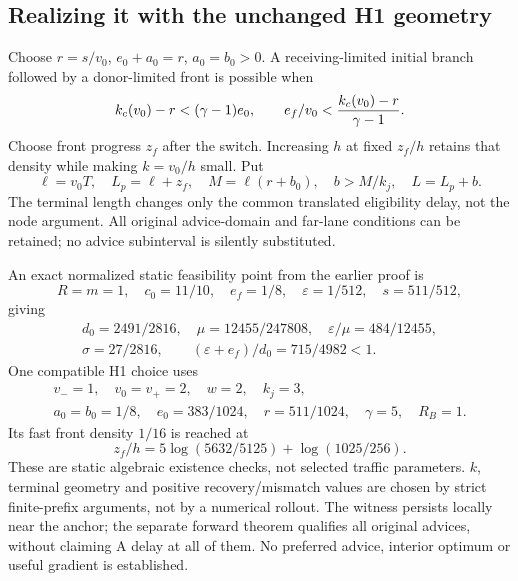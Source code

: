 \subsection{Realizing it with the unchanged H1 geometry}
Choose $r=s/v_0$, $e_0+a_0=r$, $a_0=b_0>0$. A receiving-limited
initial branch followed by a donor-limited front is possible when
\begin{equation}
 k_c(v_0)-r<(\gamma-1)e_0,\qquad
 e_f/v_0<\frac{k_c(v_0)-r}{\gamma-1}. \label{eq:wh1}
\end{equation}
Choose front progress $z_f$ after the switch. Increasing $h$ at fixed
$z_f/h$ retains that density while making $k=v_0/h$ small. Put
\begin{equation}
 \ell=v_0T,\quad L_p=\ell+z_f,\quad
 M=\ell(r+b_0),\quad b>M/k_j,\quad L=L_p+b. \label{eq:wgeometry}
\end{equation}
The terminal length changes only the common translated eligibility delay,
not the node argument. All original advice-domain and far-lane conditions
can be retained; no advice subinterval is silently substituted.

An exact normalized static feasibility point from the earlier proof is
\begin{equation}
 R=m=1,\quad c_0=11/10,\quad e_f=1/8,\quad
 \varepsilon=1/512,\quad s=511/512, \label{eq:wstatic}
\end{equation}
giving
\begin{equation}
 \begin{gathered}
 d_0=2491/2816,\quad\mu=12455/247808,\quad
 \varepsilon/\mu=484/12455,\\
 \sigma=27/2816,\qquad (\varepsilon+e_f)/d_0=715/4982<1.
 \end{gathered} \label{eq:wstaticderived}
\end{equation}
One compatible H1 choice uses
\begin{equation}
 \begin{gathered}
 v_-=1,\quad v_0=v_+=2,\quad w=2,\quad k_j=3,\\
 a_0=b_0=1/8,\quad e_0=383/1024,\quad
 r=511/1024,\quad\gamma=5,\quad R_B=1.
 \end{gathered}
 \label{eq:wstaticH1}
\end{equation}
Its fast front density $1/16$ is reached at
\begin{equation}
 z_f/h=5\log(5632/5125)+\log(1025/256). \label{eq:wfront}
\end{equation}
These are static algebraic existence checks, not selected traffic
parameters. $k$, terminal geometry and positive recovery/mismatch values
are chosen by strict finite-prefix arguments, not by a numerical rollout.
The witness persists locally near the anchor; the separate forward theorem
qualifies all original advices, without claiming A delay at all of them.
No preferred advice, interior optimum or useful gradient is established.

